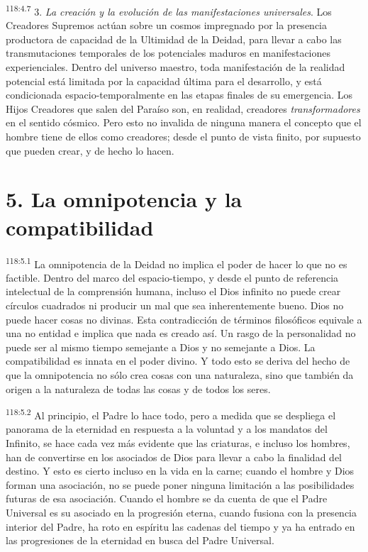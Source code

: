 \par
\textsuperscript{118:4.7} 3. \textit{La creación y la evolución de las manifestaciones universales}. Los Creadores Supremos actúan sobre un cosmos impregnado por la presencia productora de capacidad de la Ultimidad de la Deidad, para llevar a cabo las transmutaciones temporales de los potenciales maduros en manifestaciones experienciales. Dentro del universo maestro, toda manifestación de la realidad potencial está limitada por la capacidad última para el desarrollo, y está condicionada espacio-temporalmente en las etapas finales de su emergencia. Los Hijos Creadores que salen del Paraíso son, en realidad, creadores \textit{transformadores} en el sentido cósmico. Pero esto no invalida de ninguna manera el concepto que el hombre tiene de ellos como creadores; desde el punto de vista finito, por supuesto que pueden crear, y de hecho lo hacen.

\section*{5. La omnipotencia y la compatibilidad}
\par
\textsuperscript{118:5.1} La omnipotencia de la Deidad no implica el poder de hacer lo que no es factible. Dentro del marco del espacio-tiempo, y desde el punto de referencia intelectual de la comprensión humana, incluso el Dios infinito no puede crear círculos cuadrados ni producir un mal que sea inherentemente bueno. Dios no puede hacer cosas no divinas. Esta contradicción de términos filosóficos equivale a una no entidad e implica que nada es creado así. Un rasgo de la personalidad no puede ser al mismo tiempo semejante a Dios y no semejante a Dios. La compatibilidad es innata en el poder divino. Y todo esto se deriva del hecho de que la omnipotencia no sólo crea cosas con una naturaleza, sino que también da origen a la naturaleza de todas las cosas y de todos los seres.

\par
\textsuperscript{118:5.2} Al principio, el Padre lo hace todo, pero a medida que se despliega el panorama de la eternidad en respuesta a la voluntad y a los mandatos del Infinito, se hace cada vez más evidente que las criaturas, e incluso los hombres, han de convertirse en los asociados de Dios para llevar a cabo la finalidad del destino. Y esto es cierto incluso en la vida en la carne; cuando el hombre y Dios forman una asociación, no se puede poner ninguna limitación a las posibilidades futuras de esa asociación. Cuando el hombre se da cuenta de que el Padre Universal es su asociado en la progresión eterna, cuando fusiona con la presencia interior del Padre, ha roto en espíritu las cadenas del tiempo y ya ha entrado en las progresiones de la eternidad en busca del Padre Universal.

